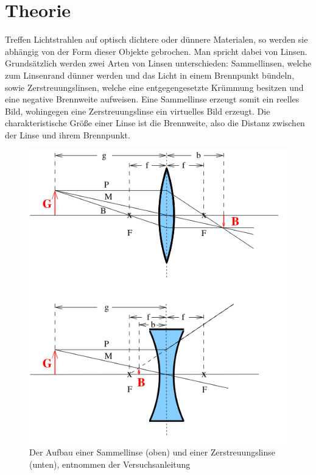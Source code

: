 \section{Theorie}
\label{sec:Theorie}

Treffen Lichtstrahlen auf optisch dichtere oder dünnere Materialen, so werden sie abhängig von der Form  dieser Objekte gebrochen.
Man spricht dabei von Linsen.
Grundsätzlich werden zwei Arten von Linsen unterschieden: Sammellinsen, welche zum Linsenrand dünner werden und das Licht in einem Brennpunkt bündeln, sowie Zerstreuungslinsen, welche eine entgegengesetzte Krümmung besitzen und eine negative Brennweite aufweisen.
Eine Sammellinse erzeugt somit ein reelles Bild, wohingegen eine Zerstreuungslinse ein virtuelles Bild erzeugt.
Die charakteristische Größe einer Linse ist die Brennweite, also die Distanz zwischen der Linse und ihrem Brennpunkt.

\begin{figure}
  \centering
  \includegraphics[scale=0.4]{images/Linsen.png}
  \caption{Der Aufbau einer Sammellinse (oben) und einer Zerstreuungslinse (unten), entnommen der Versuchsanleitung \cite[1]{sample}}
  \label{fig:Linsen}
\end{figure}

